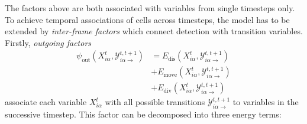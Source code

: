 \documentclass[10pt,twocolumn,letterpaper]{article}
\newcommand{\red}{\color{red}}
\begin{document}
The factors above are both associated with variables from single timesteps only. To achieve temporal associations 
of cells across timesteps, the model has to be extended by \emph{inter-frame factors} which 
connect detection with transition variables. 
Firstly, \emph{outgoing factors} 
\begin{align}
    \label{eq:psi-out}
    \psi_{\mathrm{out}}(X_{i\alpha}^t, \mathcal{Y}_{i\alpha\rightarrow}^{t,t+1})
    &= E_{\text{dis}}(X_{i\alpha}^t, \mathcal{Y}_{i\alpha\rightarrow}^{t,t+1}) \\
    &+ E_{\text{move}}(X_{i\alpha}^t, \mathcal{Y}_{i\alpha\rightarrow}^{t,t+1}) \\
    &+ E_{\text{div}}(X_{i\alpha}^t, \mathcal{Y}_{i\alpha\rightarrow}^{t,t+1})
\end{align}
associate each variable $X_{i\alpha}^t$ with all possible transitions $ \mathcal{Y}_{i\alpha\rightarrow}^{t,t+1}$ to variables in the 
successive timestep. This factor can be decomposed into three energy terms: \\ %
\end{document}
